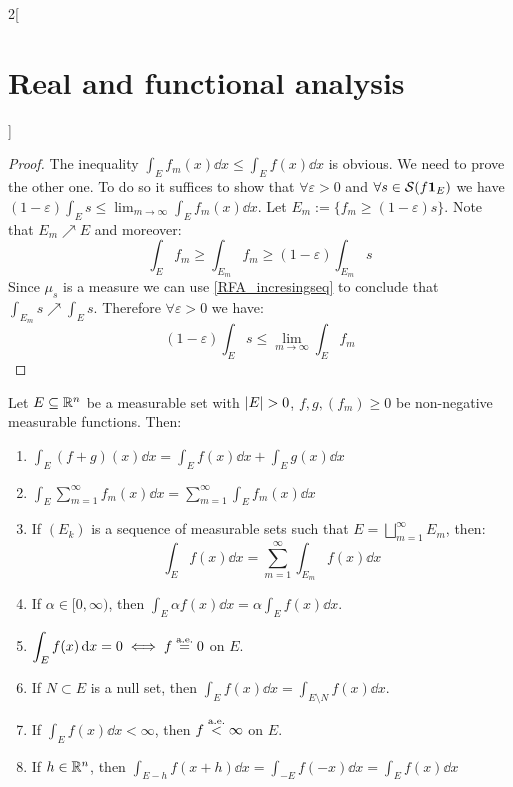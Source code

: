 \documentclass[../../../main_math.tex]{subfiles}
\begin{document}
\begin{multicols}{2}[\section{Real and functional analysis}]
\begin{important}
  \end{important}
  \begin{proof}
    The inequality $\int_Ef_m(x)\dd{x}\leq \int_Ef(x)\dd{x}$ is obvious. We need to prove the other one. To do so it suffices to show that $\forall \varepsilon>0$ and $\forall s\in\mathcal{S}(f\boldsymbol{\mathrm{1}}_{E})$ we have $(1-\varepsilon)\int_E s\leq {\displaystyle\lim_{m\to\infty}}\int_Ef_m(x)\dd{x}$.
    Let $E_m:=\{f_m\geq (1-\varepsilon)s\}$. Note that $E_m\nearrow E$ and moreover:
    $$\int_Ef_m\geq\int_{E_m}f_m\geq(1-\varepsilon)\int_{E_m}s$$
    Since $\mu_s$ is a measure we can use \cref{RFA_incresingseq} to conclude that $\int_{E_m}s\nearrow \int_{E}s$. Therefore $\forall\varepsilon>0$ we have: $$(1-\varepsilon)\int_{E}s\leq \lim_{m\to\infty}\int_Ef_m$$
  \end{proof}
  \begin{proposition}
    Let $E\subseteq\mathbb{R}^n$ be a measurable set with $\m{E}>0$, $f, g, (f_m)\geq 0$ be non-negative measurable functions. Then:
    \begin{enumerate}
      \item\label{RFA_postmonotoneA} $\displaystyle\int_E (f+g)(x)\dd{x}=\int_Ef(x)\dd{x}+\int_Eg(x)\dd{x}$
      \item\label{RFA_postmonotoneB} $\displaystyle\int_E\sum_{m=1}^\infty f_m(x)\dd{x}=\sum_{m=1}^\infty\int_E f_m(x)\dd{x}$
      \item\label{RFA_postmonotoneC} If $(E_k)$ is a sequence of measurable sets such that $E=\bigsqcup_{m=1}^\infty E_m$, then: $$\int_Ef(x)\dd{x}=\sum_{m=1}^\infty\int_{E_m}f(x)\dd{x}$$
      \item\label{RFA_postmonotoneD} If $\alpha\in[0,\infty)$, then $\displaystyle\int_E\alpha f(x)\dd{x}=\alpha\int_Ef(x)\dd{x}$.
      \item\label{RFA_postmonotoneE} $\displaystyle\int_Ef(x)\dd{x}=0\iff f\overset{\text{a.e.}}{=}0$ on $E$.
      \item\label{RFA_postmonotoneF} If $N\subset E$ is a null set, then $\displaystyle\int_Ef(x)\dd{x}=\int_{E\setminus N}f(x)\dd{x}$.
      \item\label{RFA_postmonotoneG} If $\displaystyle\int_Ef(x)\dd{x}<\infty$, then $f\overset{\text{a.e.}}{<}\infty$ on $E$.
      \item\label{RFA_postmonotoneH} If $h\in\mathbb{R}^n$, then $\displaystyle\int_{E-h}f(x+h)\dd{x}=\int_{-E}f(-x)\dd{x}=\int_{E}f(x)\dd{x}$
    \end{enumerate}
  \end{proposition}
  \begin{sproof}

\end{sproof}
\end{multicols}
\end{document}

